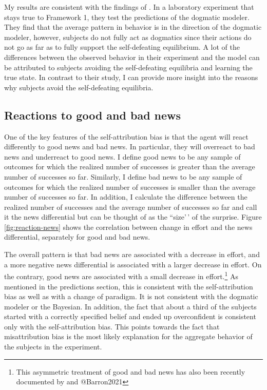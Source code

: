 \documentclass[
  12pt,
]{article}
\begin{document}
My results are consistent with the findings of \citet{Gotte2022}. In a
laboratory experiment that stays true to Framework 1, they test the
predictions of the dogmatic modeler. They find that the average pattern
in behavior is in the direction of the dogmatic modeler, however,
subjects do not fully act as dogmatics since their actions do not go as
far as to fully support the self-defeating equilibrium. A lot of the
differences between the observed behavior in their experiment and the
model can be attributed to subjects avoiding the self-defeating
equilibria and learning the true state. In contrast to their study, I
can provide more insight into the reasons why subjects avoid the
self-defeating equilibria.

\hypertarget{reactions-to-good-and-bad-news}{%
\subsection{Reactions to good and bad
news}\label{reactions-to-good-and-bad-news}}

One of the key features of the self-attribution bias is that the agent
will react differently to good news and bad news. In particular, they
will overreact to bad news and underreact to good news. I define good
news to be any sample of outcomes for which the realized number of
successes is greater than the average number of successes so far.
Similarly, I define bad news to be any sample of outcomes for which the
realized number of successes is smaller than the average number of
successes so far. In addition, I calculate the difference between the
realized number of successes and the average number of successes so far
and call it the news differential but can be thought of as the
``size'\,' of the surprise. Figure \ref{fig:reaction-news} shows the
correlation between change in effort and the news differential,
separately for good and bad news.

The overall pattern is that bad news are associated with a decrease in
effort, and a more negative news differential is associated with a
larger decrease in effort. On the contrary, good news are associated
with a small decrease in
effort.\footnote{This asymmetric treatment of good and bad news has also been recently documented by \citet{Coutts2019} and @Barron2021}
As mentioned in the predictions section, this is consistent with the
self-attribution bias as well as with a change of paradigm. It is not
consistent with the dogmatic modeler or the Bayesian. In addition, the
fact that about a third of the subjects started with a correctly
specified belief and ended up overconfident is consistent only with the
self-attribution bias. This points towards the fact that misattribution
bias is the most likely explanation for the aggregate behavior of the
subjects in the experiment.
\end{document}
